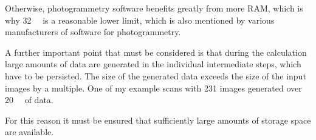 Otherwise, photogrammetry software benefits greatly from more RAM, which is why \SI{32}{\giga\byte} is a reasonable lower limit, which is also mentioned by various manufacturers of software for photogrammetry.%

A further important point that must be considered is that during the calculation large amounts of data are generated in the individual intermediate steps, which have to be persisted. The size of the generated data exceeds the size of the input images by a multiple. One of my example scans with 231 images generated over \SI{20}{\giga\byte} of data.%

For this reason it must be ensured that sufficiently large amounts of storage space are available.%